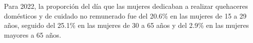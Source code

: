 Para 2022, la proporción del día que las mujeres dedicaban a realizar quehaceres domésticos y de cuidado no remunerado fue del 20.6\% en las mujeres de 15 a 29 años, seguido del 25.1\% en las mujeres de 30 a 65 años y del 2.9\% en las mujeres mayores a 65 años. 